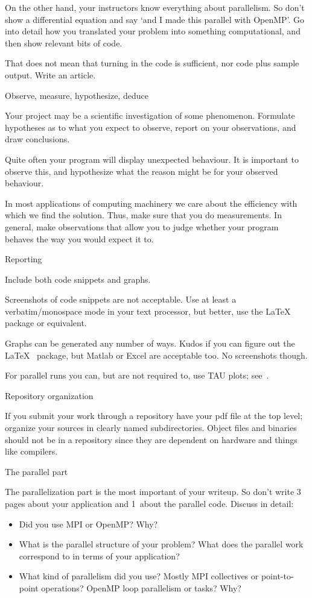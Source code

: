 On the other hand, your instructors know everything about parallelism.
So don't show a differential equation and say `and I made this parallel with OpenMP'.
Go into detail how you translated your problem into something computational,
and then show relevant bits of code.

That does not mean that turning in the code is sufficient, nor code plus sample output.
Write an article.

 {Observe, measure, hypothesize, deduce}

Your project may be a scientific investigation of some
phenomenon. Formulate hypotheses as to what you expect to observe,
report on your observations, and draw conclusions.

Quite often your program will display unexpected behaviour. It is important to observe
this, and hypothesize what the reason might be for your observed behaviour.

In most applications of computing machinery we care about the efficiency with which
we find the solution. Thus, make sure that you do measurements. In general, make
observations that allow you to judge whether your program behaves the way you
would expect it to.

 {Reporting}

Include both code snippets and graphs.

Screenshots of code snippets are not acceptable.
Use at least a verbatim/monospace mode in your text processor,
but better, use the \LaTeX\  package or equivalent.

Graphs can be generated any number of ways.
Kudos if you can figure out the \LaTeX\  package,
but Matlab or Excel are acceptable too.
No screenshots though.

For parallel runs you can, but are not required to,
use TAU plots; see~.

 {Repository organization}

If you submit your work through a repository
have your pdf file at the top level;
organize your sources in clearly named subdirectories.
Object files and binaries should not be in a repository
since they are dependent on hardware and things like compilers.

 {The parallel part}

The parallelization part is the most important of your writeup.
So don't write 3 pages about your application and 1~about the parallel code.
Discuss in detail:
\begin{itemize}
\item Did you use MPI or OpenMP? Why?
\item What is the parallel structure of your problem? What does the parallel work correspond
  to in terms of your application?
\item What kind of parallelism did you use? Mostly MPI collectives or point-to-point operations?
  OpenMP loop parallelism or tasks? Why?
\end{itemize}

